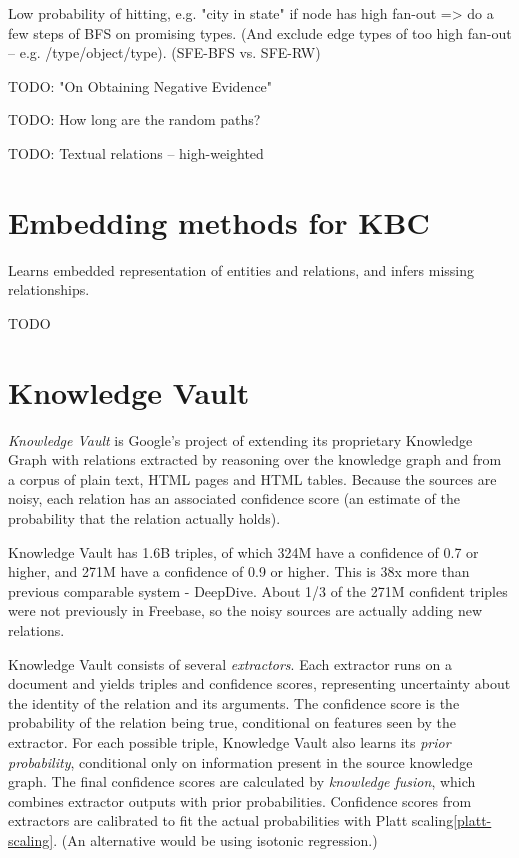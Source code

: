 Low probability of hitting, e.g. "city in state" if node has high fan-out =>
do a few steps of BFS on promising types. (And exclude edge types of too high
fan-out -- e.g. /type/object/type). (SFE-BFS vs. SFE-RW)

TODO: "On Obtaining Negative Evidence"

TODO: How long are the random paths?

TODO: Textual relations -- high-weighted

\section{Embedding methods for KBC}

Learns embedded representation of entities and relations, and infers missing
relationships.

TODO

\section{Knowledge Vault}

\textit{Knowledge Vault}\cite{knowledge-vault} is Google's project of extending its proprietary
Knowledge Graph with relations extracted by reasoning over the knowledge graph
and from a corpus of plain text, HTML pages and HTML tables. Because
the sources are noisy, each relation has an associated confidence score
(an estimate of the probability that the relation actually holds).

Knowledge Vault has 1.6B triples, of which 324M have a confidence of 0.7 or
higher, and 271M have a confidence of 0.9 or higher.
This is 38x more than previous comparable system - DeepDive.
About 1/3 of the 271M confident triples were not previously in Freebase, so
the noisy sources are actually adding new relations.

Knowledge Vault consists of several \textit{extractors}. Each extractor runs on a
document and yields triples and confidence scores, representing uncertainty
about the identity of the relation and its arguments. The confidence score is
the probability of the relation being true, conditional on features seen by
the extractor.
For each possible triple, Knowledge Vault also learns its \textit{prior
probability}, conditional only on information present in the source knowledge
graph.
The final confidence scores are calculated by \textit{knowledge fusion},
which combines extractor outputs with prior probabilities.
Confidence scores from extractors are calibrated to fit the actual probabilities
with Platt scaling\ref{platt-scaling}.
(An alternative would be using isotonic regression.)

